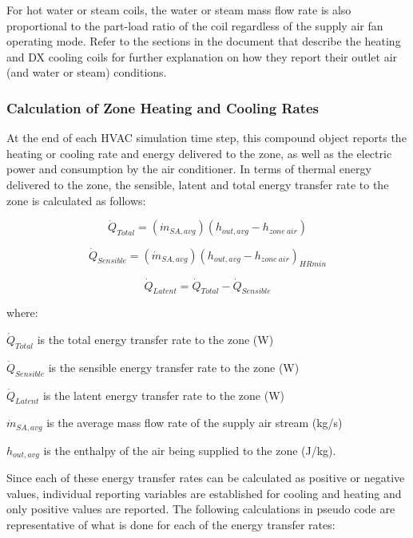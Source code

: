 For hot water or steam coils, the water or steam mass flow rate is also proportional to the part-load ratio of the coil regardless of the supply air fan operating mode. Refer to the sections in the document that describe the heating and DX cooling coils for further explanation on how they report their outlet air (and water or steam) conditions.

\subsubsection{Calculation of Zone Heating and Cooling Rates}\label{calculation-of-zone-heating-and-cooling-rates}

At the end of each HVAC simulation time step, this compound object reports the heating or cooling rate and energy delivered to the zone, as well as the electric power and consumption by the air conditioner. In terms of thermal energy delivered to the zone, the sensible, latent and total energy transfer rate to the zone is calculated as follows:

\begin{equation}
  \dot{Q}_{Total} = \left( \dot{m}_{SA,avg} \right) \left( h_{out,avg} - h_{zone~air} \right)
\end{equation}

\begin{equation}
  \dot{Q}_{Sensible} = \left( \dot{m}_{SA,avg} \right) \left( h_{out,avg} - h_{zone~air} \right)_{HRmin}
\end{equation}

\begin{equation}
  \dot{Q}_{Latent} = \dot{Q}_{Total} - \dot{Q}_{Sensible}
\end{equation}

where:

\(\dot{Q}_{Total}\) is the total energy transfer rate to the zone (W)

\(\dot{Q}_{Sensible}\) is the sensible energy transfer rate to the zone (W)

\(\dot{Q}_{Latent}\) is the latent energy transfer rate to the zone (W)

\(\dot{m}_{SA,avg}\) is the average mass flow rate of the supply air stream (kg/s)

\(h_{out,avg}\) is the enthalpy of the air being supplied to the zone (J/kg).

Since each of these energy transfer rates can be calculated as positive or negative values, individual reporting variables are established for cooling and heating and only positive values are reported. The following calculations in pseudo code are representative of what is done for each of the energy transfer rates:

